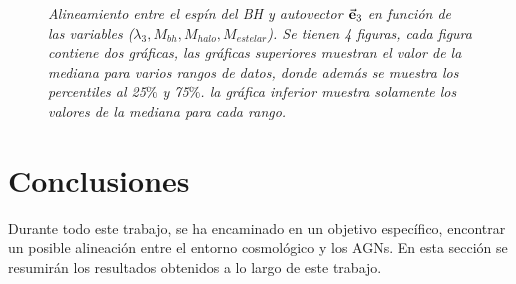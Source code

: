 \begin{figure}
\caption[Alineamiento entre el espín del BH y autovector $\vec{\bf{e}}_3$ en función de las variables ($\lambda_{3}, M_{bh}, M_{halo}, M_{estelar}$)]{\emph{Alineamiento entre el espín del BH y autovector $\vec{\bf{e}}_3$ en función de las variables ($\lambda_{3}, M_{bh}, M_{halo}, M_{estelar}$). Se tienen 4 figuras, cada figura contiene dos gráficas, las gráficas superiores muestran el valor de la mediana para varios rangos de datos, donde además se muestra los percentiles al 25$\%$ y 75$\%$. la gráfica inferior muestra solamente los valores de la mediana para cada rango.} }
\label{fig: median dispercion} 
\end{figure}







\newpage
\section{Conclusiones}
\label{sec: conclusiones}
Durante todo este trabajo, se ha encaminado en un objetivo específico, encontrar un posible alineación entre el entorno cosmológico y los AGNs. En esta sección se resumirán los resultados obtenidos a lo largo de este trabajo.

